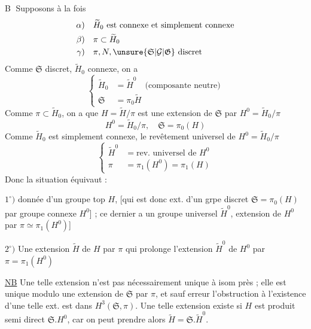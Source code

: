 \textcircled{B}
Supposons à la fois
\[
\begin{aligned}
\alpha)&\quad \widetilde H_0\ \text{est connexe et simplement connexe}\\
\beta)&\quad \pi\subset\widetilde H_0\\
\gamma)&\quad \pi,N,\unsure{\mathfrak{S}|\mathcal{G}|\mathfrak{G}}\ \text{discret}
\end{aligned}
\]
Comme \(\mathfrak{S}\) discret, \(\widetilde H_0\) connexe, on a
\[
\boxed{\left\{\begin{aligned}
\widetilde H_0&=\widetilde H^{0}\quad\text{(composante neutre)}\\
\mathfrak{S}&=\pi_0\widetilde H
\end{aligned}\right.}
\]
Comme \(\pi\subset\widetilde H_0\), on a que \(H=\widetilde H/\pi\) est une extension de \(\mathfrak{S}\) par \(H^0=\widetilde H_0/\pi\)
\[
\boxed{H^0=\widetilde H_0/\pi,\quad \mathfrak{S}=\pi_0(H)}
\]
Comme \(\widetilde H_0\) est simplement connexe,  le revêtement universel de \(H^0=\widetilde H_0/\pi\)
\[
\boxed{\left\{\begin{aligned}
\widetilde H^{0}&=\text{rev. universel de }H^0\\
\pi&=\pi_1(H^0)=\pi_1(H)
\end{aligned}\right.}
\]
Donc la situation équivaut :

\(1^\circ)\) donnée d'un groupe top \(H\),  [qui est donc ext. d'un grpe discret \(\mathfrak{S}=\pi_0(H)\) par  groupe connexe \(H^0\)] ; ce dernier  a un groupe  universel \(\widetilde H^0\), extension de \(H^0\) par \(\pi\simeq\pi_1(H^0)\)]

\(2^\circ)\) Une extension \(\widetilde H\) de \(H\) par \(\pi\) qui prolonge l'extension \(\widetilde H^0\) de \(H^0\) par \(\pi=\pi_1(H^0)\)

\uline{NB} Une telle extension n'est pas nécessairement unique à isom près ; elle est unique modulo une extension de \(\mathfrak{S}\) par \(\pi\),  et sauf erreur l'obstruction à l'existence d'une telle ext. est dans \(H^3(\mathfrak{S},\pi)\). Une telle extension existe si \(H\) est produit semi direct \(\mathfrak{S}.H^0\), car on peut prendre alors \(\widetilde H=\mathfrak{S}.\widetilde H^0\).

